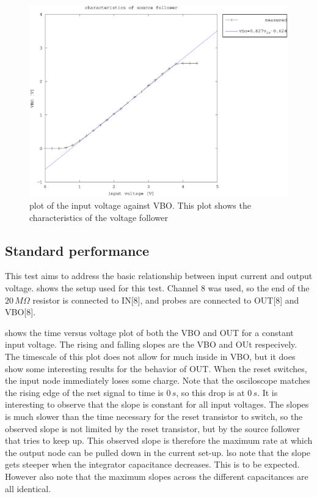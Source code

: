 \documentclass{article}
\begin{document}
\begin{figure}[h]
	    \centering
	    \includegraphics[width=\textwidth]{fig/source_follower.eps}
	    \caption[]%
	    {plot of the input voltage against VBO. This plot shows the characteristics of the voltage follower}    
	    \label{fig:source_follower}	
\end{figure}






\clearpage
\subsection{Standard performance}\label{ssec:standard}
This test aims to address the basic relationship between input current and output voltage.  shows the setup used for this test. Channel 8 was used, so the end of the $20\,M\Omega$ resistor is connected to IN[8], and probes are connected to OUT[8] and VBO[8]. 



 shows the time versus voltage plot of both the VBO and OUT for a constant input voltage. The rising and falling slopes are the VBO and OUt respecively. The timescale of this plot does not allow for much inside in VBO, but it does show some interesting results for the behavior of OUT. When the reset switches, the input node immediately loses some charge. Note that the osciloscope matches the rising edge of the rset signal to time is $0\,s$, so this drop is at $0\,s$. It is interesting to observe that the slope is constant for all input voltages. The slopes is much slower than the time necessary for the reset transistor to switch, so the observed slope is not limited by the reset transistor, but by the source follower that tries to keep up. This observed slope is therefore the maximum rate at which the output node can be pulled down in the current set-up.  lso note that the slope gets steeper when the integrator capacitance decreases. This is to be expected. However also note that the maximum slopes across the different capacitances are all identical.
\end{document}
